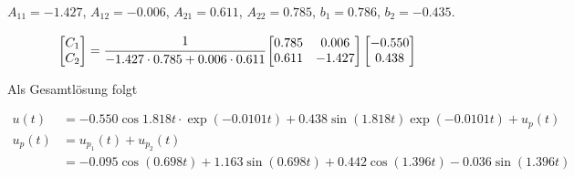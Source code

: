 \begin{solution}
    $A_{11} = -1.427$,
    $A_{12} = -0.006$,
    $A_{21} = 0.611$,
    $A_{22} = 0.785$,
    $b_1 = 0.786$,
    $b_2 = -0.435$.

    \begin{align*}
        \begin{bmatrix}
            C_1 \\
            C_2
        \end{bmatrix}
        = \cfrac{1}{-1.427 \cdot 0.785 + 0.006 \cdot 0.611}
        \begin{bmatrix}
            0.785 & 0.006 \\
            0.611 & -1.427
        \end{bmatrix}
        \begin{bmatrix}
            -0.550 \\
            0.438
        \end{bmatrix}          
    \end{align*}

    Als Gesamtlösung folgt

    \begin{align*}
        u(t) &= -0.550 \cos{1.818 t} \cdot \exp(-0.0101 t) + 0.438 \sin(1.818 t) \exp(-0.0101 t) + u_p(t) \\
        u_p(t) &= u_{p_1}(t) + u_{p_2}(t) \\
        & = -0.095 \cos(0.698 t) + 1.163 \sin(0.698 t) + 0.442 \cos(1.396t) -0.036 \sin(1.396 t)
    \end{align*}
\end{solution}

